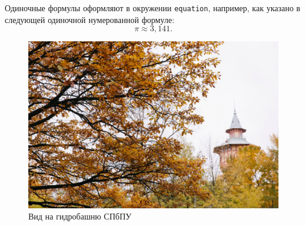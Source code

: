 Одиночные формулы оформляют в окружении \texttt{equation}, например, как указано в следующей одиночной нумерованной формуле:
%
%
\begin{equation}%
\label{eq:Pi-ch1} %
\pi \approx 3,141.
\end{equation}
%
%
\begin{figure}[ht!] 
	\center
	\includegraphics [scale=0.27] {my_folder/images//spbpu_hydrotower}
	\caption{Вид на гидробашню СПбПУ \cite{spbpu-gallery}} 
	\label{fig:spbpu_hydrotower}  
\end{figure}
%
%


